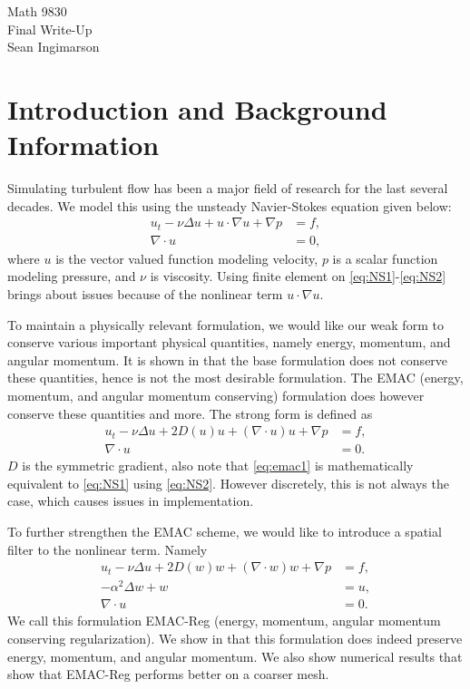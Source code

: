 \documentclass[12pt]{article}
\newcommand{\divergence}{\nabla \cdot}
\numberwithin{equation}{section}
\begin{document}
\begin{center}
\begin{large}
Math 9830\\
Final Write-Up\\
Sean Ingimarson
\end{large}
\end{center}

\section{Introduction and Background Information}

Simulating turbulent flow has been a major field of research for the last several decades.  We model this using the unsteady Navier-Stokes equation given below:
\begin{align}
u_t-\nu \Delta u+u \cdot \nabla u + \nabla p &= f, \label{eq:NS1}\\
\divergence u&=0, \label{eq:NS2}
\end{align}
where $u$ is the vector valued function modeling velocity, $p$ is a scalar function modeling pressure, and $\nu$ is viscosity.  Using finite element on \eqref{eq:NS1}-\eqref{eq:NS2} brings about issues because of the nonlinear term $u \cdot \nabla u$.

To maintain a physically relevant formulation, we would like our weak form to conserve various important physical quantities, namely energy, momentum, and angular momentum.  It is shown in \cite{CHOR17} that the base formulation does not conserve these quantities, hence is not the most desirable formulation.  The EMAC (energy, momentum, and angular momentum conserving) formulation does however conserve these quantities and more.  The strong form is defined as
\begin{align}
u_t-\nu \Delta u + 2D(u)u+(\divergence u)u+ \nabla p &= f, \label{eq:emac1}\\
\divergence u&=0. \label{eq:emac2}
\end{align}
$D$ is the symmetric gradient, also note that \eqref{eq:emac1} is mathematically equivalent to \eqref{eq:NS1} using \eqref{eq:NS2}.  However discretely, this is not always the case, which causes issues in implementation.

To further strengthen the EMAC scheme, we would like to introduce a spatial filter to the nonlinear term.  Namely
\begin{align}
u_t-\nu \Delta u + 2D(w)w+(\divergence w)w+ \nabla p &= f, \label{eq:emacreg1}\\
-\alpha^2 \Delta w + w & = u, \label{eq:emacreg2}\\
\divergence u&=0. \label{eq:emacreg3}
\end{align}
We call this formulation EMAC-Reg (energy, momentum, angular momentum conserving regularization).  We show in \cite{I20} that this formulation does indeed preserve energy, momentum, and angular momentum.  We also show numerical results that show that EMAC-Reg performs better on a coarser mesh.
\end{document}
